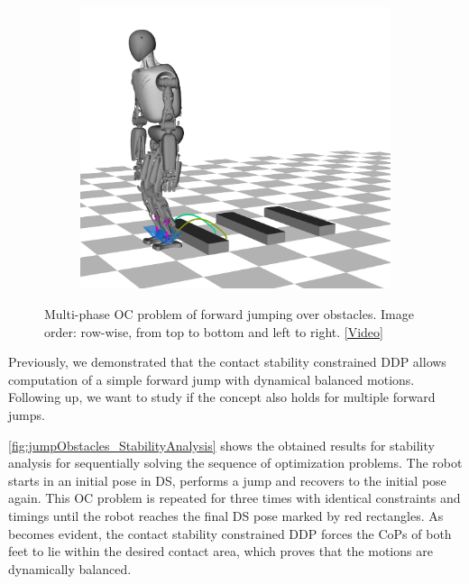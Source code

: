 \begin{figure}[h!]
\begin{subfigure}{.33\textwidth}
	\includegraphics[width=1\linewidth]{fig/jumpObstacles/snaps/7x}
	\caption{}
\end{subfigure}%
\caption[Multi-phase \gls{OC} problem of forward jumping over obstacles]{Multi-phase \gls{OC} problem of forward jumping over obstacles. Image order: row-wise, from top to bottom and left to right. \href{https://github.com/julesser/ma-thesis-simulation-results/blob/master/Jump_MultipleObstacles_NoJLimsNoTLims/crocoddyl.mp4}{[Video]}}
\label{fig:jumpObstacles_Snaps}
\end{figure} 

Previously, we demonstrated that the contact stability constrained \gls{DDP} allows computation of a simple forward jump with dynamical balanced motions. Following up, we want to study if the concept also holds for multiple forward jumps. 

\cref{fig:jumpObstacles_StabilityAnalysis} shows the obtained results for stability analysis for sequentially solving the sequence of optimization problems. The robot starts in an initial pose in \gls{DS}, performs a jump and recovers to the initial pose again. This \gls{OC} problem is repeated for three times with identical constraints and timings until the robot reaches the final \gls{DS} pose marked by red rectangles. As becomes evident, the contact stability constrained \gls{DDP} forces the \gls{CoP}s of both feet to lie within the desired contact area, which proves that the motions are dynamically balanced. 

